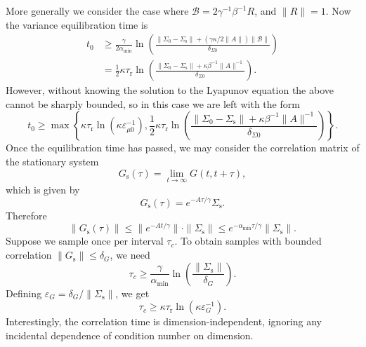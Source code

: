 \documentclass[prx,onecolumn,floatfix,longbibliography,notitlepage, nofootinbib]{revtex4-1}
\renewcommand{\geq}{\geqslant}
\renewcommand{\leq}{\leqslant}
\begin{document}
\begin{appendix}
More generally we consider the case where $\mathcal{B} = 2 \gamma^{-1} \beta^{-1} R$, and $\|R\|=1$. Now the variance equilibration time is
\begin{align}
t_0  & \geq  \frac{\gamma}{2 \alpha_\text{min}}\ln\left(\frac{\|\Sigma_0 - \Sigma_\text{s}\| + (\gamma \kappa / 2\|A\|)\|\mathcal{B}\|}{\delta_{\Sigma 0}}\right)\\
&= \frac{1}{2}\kappa\tau_\text{r}\ln\left(\frac{\|\Sigma_0 - \Sigma_\text{s}\| + \kappa \beta^{-1} \|A\|^{-1}
}{\delta_{\Sigma 0}}\right)
.
\end{align}
However, without knowing the solution to the Lyapunov equation the above cannot be sharply bounded, so in this case we are left with the form
\begin{equation}
t_0 \geq \max \left\{\kappa \tau_\text{r}\ln \left(\kappa \varepsilon^{-1}_{\mu 0}\right),\frac{1}{2}\kappa\tau_\text{r}\ln\left(\frac{\|\Sigma_0 - \Sigma_\text{s}\| + \kappa \beta^{-1} \|A\|^{-1}
}{\delta_{\Sigma 0}}\right)
\right\}.
\end{equation}
Once the equilibration time has passed, we may consider the correlation matrix of the stationary system
\begin{equation}
    G_\text{s}(\tau) = \lim_{t \to \infty} G(t, t+\tau),
\end{equation}
which is given by 
\begin{equation}
    G_\text{s}(\tau) = e^{-A \tau/\gamma} \Sigma_\text{s}.
\end{equation}
Therefore
\begin{equation}
    \|G_\text{s}(\tau)\| \leq \|e^{-A t/\gamma}\| \cdot \|\Sigma_\text{s}\| \leq e^{- \alpha_\text{min} \tau/\gamma}  \left\|\Sigma_\text{s}\right\|.
\end{equation}
Suppose we sample once per interval $\tau_c$. To obtain samples with bounded correlation $\left\| G_\text{s} \right \| \leq \delta_G $, we need
\begin{equation}
    \tau_c \geq \frac{\gamma}{\alpha_\text{min}} \ln \left(\frac{\|\Sigma_\text{s}\|}{\delta_G}\right).
\end{equation}
Defining $\varepsilon_G = \delta_G/\|\Sigma_\text{s}\|$, we get
\begin{equation}
    \tau_c \geq\kappa \tau_\text{r} \ln \left(\kappa \varepsilon_G^{-1}\right).
\end{equation}
Interestingly, the correlation time is dimension-independent, ignoring any incidental dependence of condition number on dimension.



\end{appendix}
\end{document}
